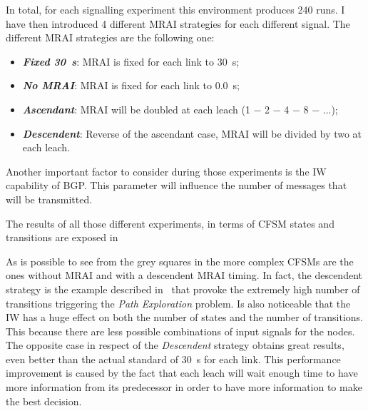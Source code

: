 In total, for each signalling experiment this environment produces \num{240} runs.
I have then introduced \num{4} different \ac{MRAI} strategies for each different
signal.
The different \ac{MRAI} strategies are the following one:
\begin{itemize}
	\item \textbf{\textit{Fixed \SI{30}{\second}}}: \ac{MRAI} is fixed for each link to \SI{30}{\second};
	\item \textbf{\textit{No \ac{MRAI}}}: \ac{MRAI} is fixed for each link to \SI{0.0}{\second};
	\item \textbf{\textit{Ascendant}}: \ac{MRAI} will be doubled at each leach (1 − 2 − 4 − 8 − ...);
	\item \textbf{\textit{Descendent}}: Reverse of the ascendant case, \ac{MRAI} will be divided by two at each leach.
\end{itemize}

Another important factor to consider during those experiments is the \ac{IW}
capability of \ac{BGP}.
This parameter will influence the number of messages
that will be transmitted.

The results of all those different experiments, in terms of \ac{CFSM} states and
transitions are exposed in 

\begin{table}[h]
	
	\caption{Fabrikant \ac{CFSM}s results, $|S|$ is the dimension of the states set
		$|T|$ is the dimension of the transitions set, The worst results for each
		category are colored in gray, the topology contains \num{3} rings, as
		, the environment is described in in
		}
	\label{tbl:fabrikant_cfsm}
\end{table}

As is possible to see from the grey squares in  the more
complex \ac{CFSM}s are the ones without \ac{MRAI} and with a descendent \ac{MRAI}
timing.
In fact, the descendent strategy is the example described in~\cite{fabrikant2011there}
that provoke the extremely high number of transitions triggering the \textit{Path Exploration}
problem.
Is also noticeable that the \ac{IW} has a huge effect on both the number
of states and the number of transitions.
This because there are less possible combinations of input signals for the nodes.
The opposite case in respect of the \textit{Descendent} strategy obtains
great results, even better than the actual standard of \SI{30}{\second} for
each link.
This performance improvement is caused by the fact that each leach will wait
enough time to have more information from its predecessor in order to have
more information to make the best decision.

